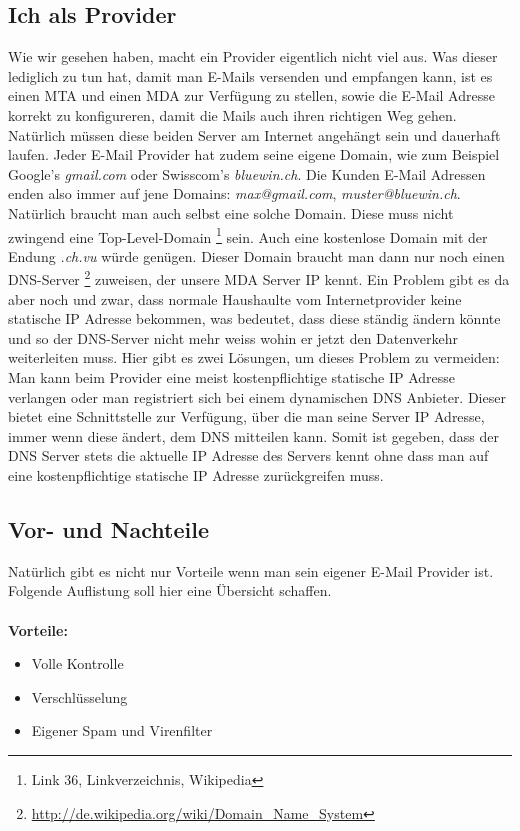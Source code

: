 \subsection{Ich als Provider}
Wie wir gesehen haben, macht ein Provider eigentlich nicht viel aus. Was dieser lediglich zu tun hat, damit man E-Mails versenden und empfangen kann, ist es einen MTA und einen MDA zur Verfügung zu stellen, sowie die E-Mail Adresse korrekt zu konfigureren, damit die Mails auch ihren richtigen Weg gehen. Natürlich müssen diese beiden Server am Internet angehängt sein und dauerhaft laufen.
Jeder E-Mail Provider hat zudem seine eigene Domain, wie zum Beispiel Google's \textit{gmail.com} oder Swisscom's \textit{bluewin.ch}. Die Kunden E-Mail Adressen enden also immer auf jene Domains: \textit{max@gmail.com}, \textit{muster@bluewin.ch}. Natürlich braucht man auch selbst eine solche Domain. Diese muss nicht zwingend eine Top-Level-Domain \footnote{Link 36, Linkverzeichnis, Wikipedia} sein. Auch eine kostenlose Domain mit der Endung \textit{.ch.vu} würde genügen. Dieser Domain braucht man dann nur noch einen DNS-Server \footnote{\url{http://de.wikipedia.org/wiki/Domain\_Name\_System}} zuweisen, der unsere MDA Server IP kennt. Ein Problem gibt es da aber noch und zwar, dass normale Haushaulte vom Internetprovider keine statische IP Adresse bekommen, was bedeutet, dass diese ständig ändern könnte und so der DNS-Server nicht mehr weiss wohin er jetzt den Datenverkehr weiterleiten muss. Hier gibt es zwei Lösungen, um dieses Problem zu vermeiden: Man kann beim Provider eine meist kostenpflichtige statische IP Adresse verlangen oder man registriert sich bei einem dynamischen DNS Anbieter. Dieser bietet eine Schnittstelle zur Verfügung, über die man seine Server IP Adresse, immer wenn diese ändert, dem DNS mitteilen kann. Somit ist gegeben, dass der DNS Server stets die aktuelle IP Adresse des Servers kennt ohne dass man auf eine kostenpflichtige statische IP Adresse zurückgreifen muss.

\subsection{Vor- und Nachteile}
Natürlich gibt es nicht nur Vorteile wenn man sein eigener E-Mail Provider ist. Folgende Auflistung soll hier eine Übersicht schaffen. \\ \\

\textbf{Vorteile:}
\begin{itemize}
    \item Volle Kontrolle
    \item Verschlüsselung
    \item Eigener Spam und Virenfilter
\end{itemize}

